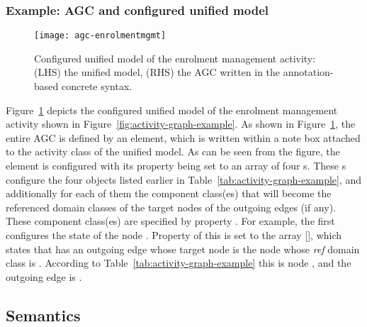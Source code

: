 \subsubsection*{Example: AGC and configured unified model}
\begin{figure}[ht]
	\begin{center}
		\texttt{[image: agc-enrolmentmgmt]}
	\end{center}
	\caption{Configured unified model of the enrolment management activity: (LHS) the unified model, (RHS) the AGC written in the annotation-based concrete syntax.} %
	\label{fig:agc-enrolmentmgmt}
\end{figure}

Figure~\ref{fig:agc-enrolmentmgmt} depicts the configured unified model of the enrolment management activity shown in  Figure~\ref{fig:activity-graph-example}. As shown in Figure~\ref{fig:agc-enrolmentmgmt}, the entire AGC is defined by an  element, which is written within a note box attached to the activity class  of the unified model.
%
As can be seen from the figure, the  element is configured with its property  being set to an array of four s. These s configure the four  objects listed earlier in Table~\ref{tab:activity-graph-example}, and additionally for each of them the component class(es) that will become the referenced domain classes of the target nodes of the outgoing edges (if any). These component class(es) are specified by property . For example, the first  configures the state of the node . Property  of this  is set to the array [], which states that  has an outgoing edge whose target node is the node whose \textit{ref} domain class is . According to Table~\ref{tab:activity-graph-example} this is node , and the outgoing edge is .

\subsection{Semantics} \label{sect:agl-semantics}


